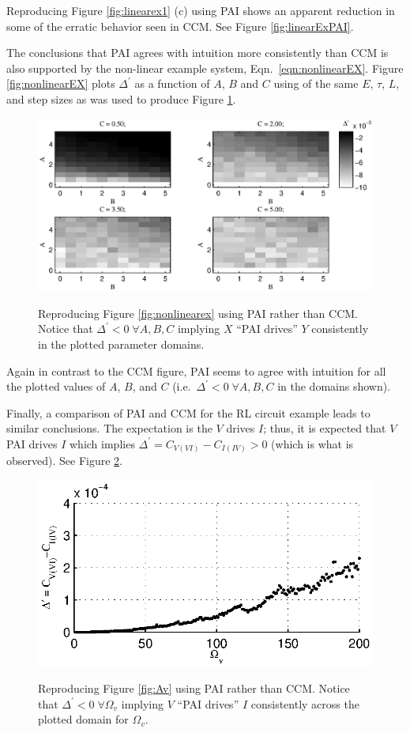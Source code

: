 \documentclass[twocolumn,aps,pre,groupedaddress]{revtex4-1}
\begin{document}
Reproducing Figure \ref{fig:linearex1} (c) using PAI shows an apparent reduction in some of the erratic behavior seen in CCM.  See Figure \ref{fig:linearExPAI}.

The conclusions that PAI agrees with intuition more consistently than CCM is also supported by the non-linear example system, Eqn.\ \ref{eqn:nonlinearEX}.  Figure \ref{fig:nonlinearEX} plots $\Delta^\prime$ as a function of $A$, $B$ and $C$ using of the same $E$, $\tau$, $L$, and step sizes as was used to produce Figure \ref{fig:nonlinearEXPAI}.
\begin{figure}[ht]
\includegraphics[scale=0.5]{NonLinearPAIEx.eps} \\
\caption{Reproducing Figure \ref{fig:nonlinearex} using PAI rather than CCM.  Notice that $\Delta^\prime<0\;\forall A,B,C$ implying $X$ ``PAI drives'' $Y$ consistently in the plotted parameter domains.}
\label{fig:nonlinearEXPAI}
\end{figure}
Again in contrast to the CCM figure, PAI seems to agree with intuition for all the plotted values of $A$, $B$, and $C$ (i.e.\ $\Delta^\prime<0\;\forall A,B,C$ in the domains shown).

Finally, a comparison of PAI and CCM for the RL circuit example leads to similar conclusions.  The expectation is the $V$ drives $I$; thus, it is expected that $V$ PAI drives $I$ which implies $\Delta^\prime = C_{V(VI)} - C_{I(IV)} > 0$ (which is what is observed).  See Figure \ref{fig:AvPAI}.
\begin{figure}[ht]
\includegraphics[scale=0.8]{RLCircuitVaryV_FreqPAI.eps} \\
\caption{Reproducing Figure \ref{fig:Av} using PAI rather than CCM.  Notice that $\Delta^\prime<0\;\forall \Omega_v$ implying $V$ ``PAI drives'' $I$ consistently across the plotted domain for $\Omega_v$.}
\label{fig:AvPAI}
\end{figure}
\end{document}
